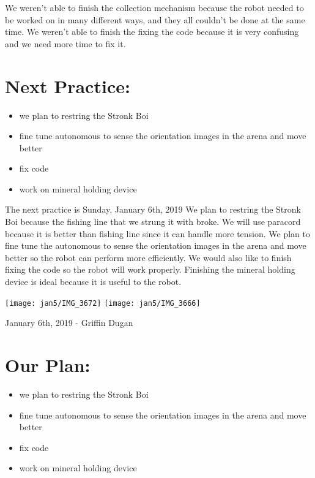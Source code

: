 \documentclass[12pt]{article}
\begin{document}
We weren’t able to finish the collection mechanism because the robot needed to be worked on in many different ways, and they all couldn’t be done at the same time. We weren’t able to finish the fixing the code because it is very confusing and we need more time to fix it.

\section{Next Practice:}
\begin{itemize}
	\item we plan to restring the Stronk Boi
\item fine tune autonomous to sense the orientation images in the arena and move better
\item fix code
\item work on mineral holding device
\end{itemize}

The next practice is Sunday, January 6th, 2019
We plan to restring the Stronk Boi because the fishing line that we strung it with broke. We will use paracord because it is better than fishing line since it can handle more tension. We plan to fine tune the autonomous to sense the orientation images in the arena and move better so the robot can perform more efficiently. We would also like to finish fixing the code so the robot will work properly. Finishing the mineral holding device is ideal because it is useful to the robot.

\texttt{[image: jan5/IMG\_3672]}
\texttt{[image: jan5/IMG\_3666]}

\newpage
\setcounter{section}{0}

January 6th, 2019 - Griffin Dugan

\section{Our Plan:}
\begin{itemize}
	\item we plan to restring the Stronk Boi
	\item fine tune autonomous to sense the orientation images in the arena and move better
	\item fix code
	\item work on mineral holding device
\end{itemize}
\end{document}
